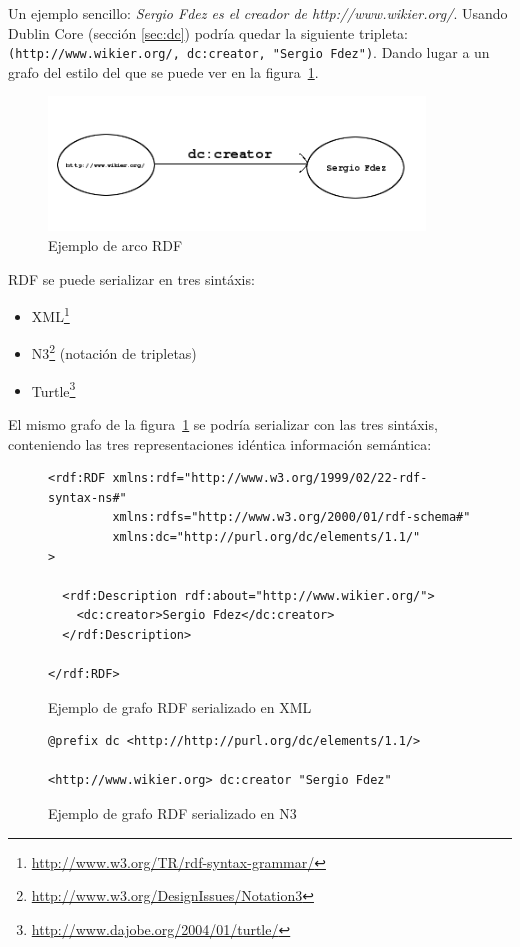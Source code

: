 Un ejemplo sencillo: \textit{Sergio Fdez es el creador de http://www.wikier.org/}. 
Usando Dublin Core (sección \ref{sec:dc}) podría quedar la siguiente tripleta: 
\texttt{(http://www.wikier.org/, dc:creator, "Sergio Fdez")}. Dando lugar a un 
grafo del estilo del que se puede ver en la figura~\ref{fig:rdfTripletExample}.

\begin{figure}[H]
	\centering
	\includegraphics[width=10cm]{images/arc-example.png}
	\caption{Ejemplo de arco RDF}
	\label{fig:rdfTripletExample}
\end{figure}


RDF se puede serializar en tres sintáxis: 

\begin{itemize}
 \item XML\footnote{\url{http://www.w3.org/TR/rdf-syntax-grammar/}}
 \item N3\footnote{\url{http://www.w3.org/DesignIssues/Notation3}} (notación de tripletas)
 \item Turtle\footnote{\url{http://www.dajobe.org/2004/01/turtle/}}
\end{itemize}

El mismo grafo de la figura~\ref{fig:rdfTripletExample} se podría serializar 
con las tres sintáxis, conteniendo las tres representaciones idéntica información 
semántica:

\begin{figure}[H]
\lstset{language=XML}
\begin{lstlisting}
<rdf:RDF xmlns:rdf="http://www.w3.org/1999/02/22-rdf-syntax-ns#"
         xmlns:rdfs="http://www.w3.org/2000/01/rdf-schema#"
         xmlns:dc="http://purl.org/dc/elements/1.1/"
>

  <rdf:Description rdf:about="http://www.wikier.org/">
    <dc:creator>Sergio Fdez</dc:creator>
  </rdf:Description>

</rdf:RDF>
\end{lstlisting}
\caption{Ejemplo de grafo RDF serializado en XML}
\label{fig:ejemplo.rdfxml}
\end{figure}

\begin{figure}[H]
\lstset{language=XML}
\begin{lstlisting}
@prefix dc <http://http://purl.org/dc/elements/1.1/>

<http://www.wikier.org> dc:creator "Sergio Fdez"
\end{lstlisting}
\caption{Ejemplo de grafo RDF serializado en N3}
\label{fig:ejemplo.rdfn3}
\end{figure}

